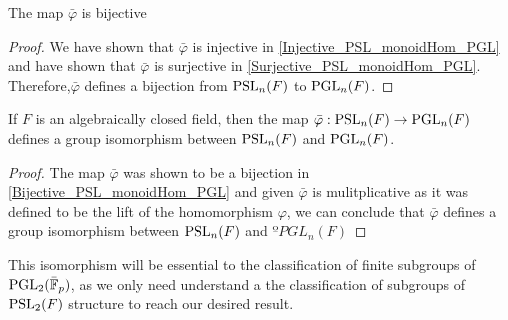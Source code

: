 \begin{lemma}
\label{Bijective_PSL_monoidHom_PGL}
\leanok
    The map $\bar{\varphi}$ is bijective
\end{lemma}

\begin{proof}
\leanok
 We have shown that $\bar{\varphi}$ is injective in \ref{Injective_PSL_monoidHom_PGL} and have shown that $\bar{\varphi}$ is surjective in \ref{Surjective_PSL_monoidHom_PGL}. 
 Therefore,$\bar{\varphi}$ defines a bijection from $\operatorname{PSL}_n(F)$ to $\operatorname{PGL}_n(F)$.
\end{proof}

\begin{theorem}
\label{PGL_iso_PSL}
\leanok
    If $F$ is an algebraically closed field, then the map $\bar{\varphi} : \operatorname{PSL}_n(F) \rightarrow \operatorname{PGL}_n(F)$ defines a group isomorphism between $\operatorname{PSL}_n(F)$ and $\operatorname{PGL}_n(F)$.
\end{theorem}

\begin{proof}
    The map $\bar{\varphi}$ was shown to be a bijection in \ref{Bijective_PSL_monoidHom_PGL} and given $\bar{\varphi}$ is mulitplicative as it was defined to be the lift of the homomorphism $\varphi$, we can conclude that 
    $\bar{\varphi}$ defines a group isomorphism between $\operatorname{PSL}_n(F)$ and $ºPGL_n(F)$
\end{proof}




This isomorphism will be essential to the classification of finite subgroups of $\operatorname{PGL}_2(\bar{\mathbb{F}}_p)$, as we only need understand a the classification of subgroups of $\operatorname{PSL}_2(F)$ structure to reach our desired result.


